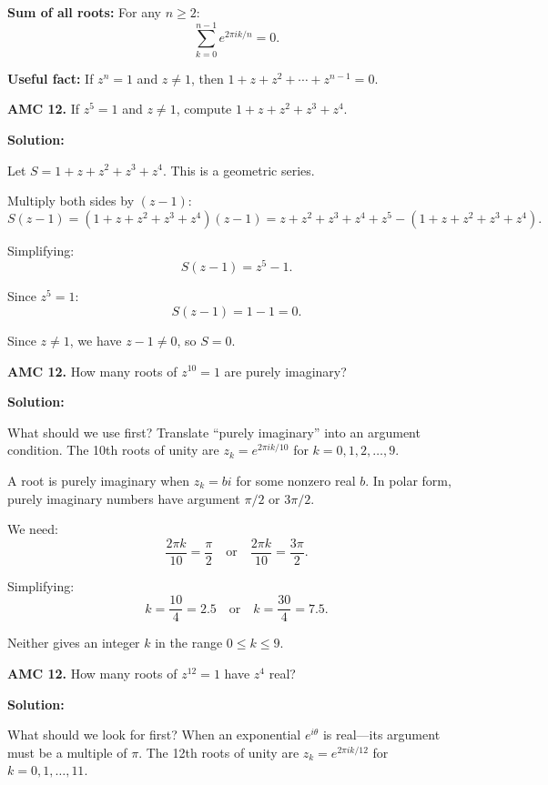 \documentclass[12pt]{extarticle}
\begin{document}
\textbf{Sum of all roots:} For any $n \geq 2$:
\[
\sum_{k=0}^{n-1} e^{2\pi ik/n} = 0.
\]

\textbf{Useful fact:} If $z^n = 1$ and $z \neq 1$, then $1 + z + z^2 + \cdots + z^{n-1} = 0$.

\begin{examplebox}
\textbf{AMC 12.} If $z^5 = 1$ and $z \neq 1$, compute $1+z+z^2+z^3+z^4$.
\end{examplebox}

\textbf{Solution:}

Let $S = 1 + z + z^2 + z^3 + z^4$. This is a geometric series.

Multiply both sides by $(z - 1)$:
\[
S(z - 1) = (1 + z + z^2 + z^3 + z^4)(z - 1) = z + z^2 + z^3 + z^4 + z^5 - (1 + z + z^2 + z^3 + z^4).
\]

Simplifying:
\[
S(z - 1) = z^5 - 1.
\]

Since $z^5 = 1$:
\[
S(z - 1) = 1 - 1 = 0.
\]

Since $z \neq 1$, we have $z - 1 \neq 0$, so $S = 0$.


\begin{examplebox}
\textbf{AMC 12.} How many roots of $z^{10} = 1$ are purely imaginary?
\end{examplebox}

\textbf{Solution:}

What should we use first? Translate “purely imaginary” into an argument condition.
The 10th roots of unity are $z_k = e^{2\pi i k/10}$ for $k = 0, 1, 2, \ldots, 9$.

A root is purely imaginary when $z_k = bi$ for some nonzero real $b$. In polar form, purely imaginary numbers have argument $\pi/2$ or $3\pi/2$.

We need:
\[
\frac{2\pi k}{10} = \frac{\pi}{2} \quad \text{or} \quad \frac{2\pi k}{10} = \frac{3\pi}{2}.
\]

Simplifying:
\[
k = \frac{10}{4} = 2.5 \quad \text{or} \quad k = \frac{30}{4} = 7.5.
\]

Neither gives an integer $k$ in the range $0 \le k \le 9$.


\begin{examplebox}
\textbf{AMC 12.} How many roots of $z^{12} = 1$ have $z^4$ real?
\end{examplebox}

\textbf{Solution:}

What should we look for first? When an exponential $e^{i\theta}$ is real—its argument must be a multiple of $\pi$.
The 12th roots of unity are $z_k = e^{2\pi i k/12}$ for $k = 0, 1, \ldots, 11$.
\end{document}
